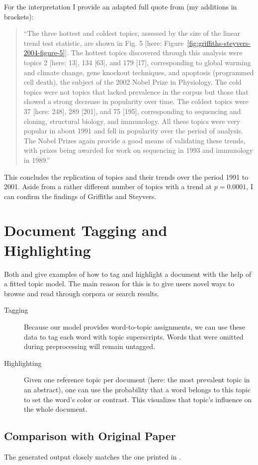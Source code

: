 For the interpretation I provide an adapted full quote from \citet[pp. 5233--5234]{Griffiths2004} (my additions in brackets):
\begin{quote}
``The three hottest and coldest topics,
assessed by the size of the linear trend test statistic, are shown
in Fig. 5 [here: Figure~\ref{fig:griffiths-steyvers-2004-figure-5}]. The hottest topics discovered through this analysis were
topics 2 [here: 13], 134 [63], and 179 [17], corresponding to global warming and
climate change, gene knockout techniques, and apoptosis (programmed cell death), the subject of the 2002 Nobel Prize in
Physiology. The cold topics were not topics that lacked prevalence in the corpus but those that showed a strong decrease in
popularity over time. The coldest topics were 37 [here: 248], 289 [201], and 75 [195],
corresponding to sequencing and cloning, structural biology, and
immunology. All these topics were very popular in about 1991
and fell in popularity over the period of analysis. The Nobel
Prizes again provide a good means of validating these trends,
with prizes being awarded for work on sequencing in 1993 and
immunology in 1989.''
\end{quote}

This concludes the replication of topics and their trends over the period 1991 to 2001. Aside from a rather different number of topics with a trend at $p=0.0001$, I can confirm the findings of Griffiths and Steyvers.


\section{Document Tagging and Highlighting}

Both \citet{Blei2003} and \citet{Griffiths2004} give examples of how to tag and highlight a document with the help of a fitted topic model. The main reason for this is to give users novel ways to browse and read through corpora or search results.
\begin{description}
 \item[Tagging] Because our  model provides word-to-topic assignments, we can use these data to tag each word with topic superscripts. Words that were omitted during preprocessing will remain untagged.
\item[Highlighting] Given one reference topic per document (here: the most prevalent topic in an abstract), one can use the probability that a word belongs to this topic to set the word's color or contrast. This visualizes that topic's influence on the whole document.
 \end{description}



\subsection{Comparison with Original Paper}
The generated output closely matches the one printed in \citet{Griffiths2004}.

